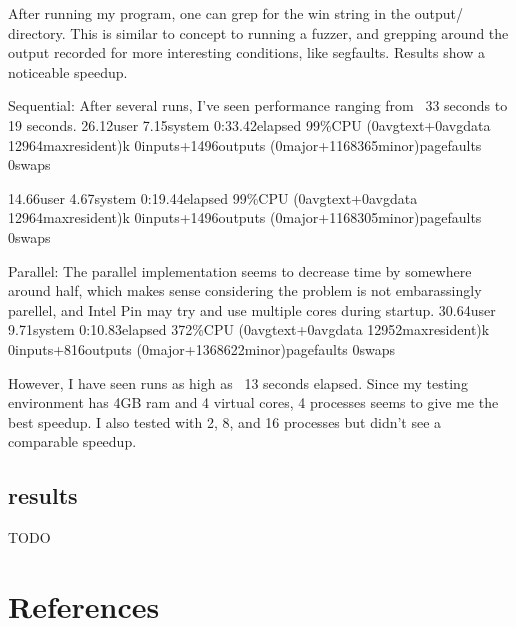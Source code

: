 \documentclass[11pt,expanded,copyright]{fsuthesis}
\begin{document}
After running my program, one can grep for the win string in the output/ directory. This is similar to concept to running a fuzzer, and grepping around the output recorded for more interesting conditions, like segfaults. Results show a noticeable speedup.

Sequential:
After several runs, I've seen performance ranging from ~33 seconds to 19 seconds.
26.12user 7.15system 0:33.42elapsed 99\%CPU (0avgtext+0avgdata 12964maxresident)k
0inputs+1496outputs (0major+1168365minor)pagefaults 0swaps

14.66user 4.67system 0:19.44elapsed 99\%CPU (0avgtext+0avgdata 12964maxresident)k
0inputs+1496outputs (0major+1168305minor)pagefaults 0swaps

Parallel:
The parallel implementation seems to decrease time by somewhere around half, which makes sense considering the problem is not embarassingly parellel, and Intel Pin may try and use multiple cores during startup.
30.64user 9.71system 0:10.83elapsed 372\%CPU (0avgtext+0avgdata 12952maxresident)k
0inputs+816outputs (0major+1368622minor)pagefaults 0swaps

However, I have seen runs as high as ~13 seconds elapsed. Since my testing environment has 4GB ram and 4 virtual cores, 4 processes seems to give me the best speedup. I also tested with 2, 8, and 16 processes but didn't see a comparable speedup.

%

\section{results}

TODO


	
\chapter{References}
\end{document}
